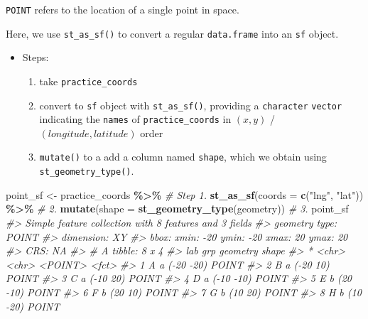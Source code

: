 \documentclass[
]{report}
\newenvironment{Shaded}{\begin{snugshade}}{\end{snugshade}}
\newcommand{\CommentTok}[1]{\textcolor[rgb]{0.56,0.35,0.01}{\textit{#1}}}
\newcommand{\DataTypeTok}[1]{\textcolor[rgb]{0.13,0.29,0.53}{#1}}
\newcommand{\KeywordTok}[1]{\textcolor[rgb]{0.13,0.29,0.53}{\textbf{#1}}}
\newcommand{\NormalTok}[1]{#1}
\newcommand{\OperatorTok}[1]{\textcolor[rgb]{0.81,0.36,0.00}{\textbf{#1}}}
\newcommand{\StringTok}[1]{\textcolor[rgb]{0.31,0.60,0.02}{#1}}
\providecommand{\tightlist}{%
  \setlength{\itemsep}{0pt}\setlength{\parskip}{0pt}}
\begin{document}
\texttt{POINT} refers to the location of a single point in space.

Here, we use \texttt{st\_as\_sf()} to convert a regular \texttt{data.frame} into an \texttt{sf} object.

\begin{itemize}
\tightlist
\item
  Steps:

  \begin{enumerate}
  \def\labelenumi{\arabic{enumi}.}
  \tightlist
  \item
    take \texttt{practice\_coords}
  \item
    convert to \texttt{sf} object with \texttt{st\_as\_sf()}, providing a \texttt{character} \texttt{vector} indicating the \texttt{names} of \texttt{practice\_coords} in \((x, y)\) / \((longitude, latitude)\) order
  \item
    \texttt{mutate()} to a add a column named \texttt{shape}, which we obtain using \texttt{st\_geometry\_type()}.
  \end{enumerate}
\end{itemize}

\begin{Shaded}
\begin{Highlighting}[]
\NormalTok{point\_sf \textless{}{-}}\StringTok{ }\NormalTok{practice\_coords }\OperatorTok{\%\textgreater{}\%}\StringTok{              }\CommentTok{\# Step 1.}
\StringTok{  }\KeywordTok{st\_as\_sf}\NormalTok{(}\DataTypeTok{coords =} \KeywordTok{c}\NormalTok{(}\StringTok{"lng"}\NormalTok{, }\StringTok{"lat"}\NormalTok{)) }\OperatorTok{\%\textgreater{}\%}\StringTok{     }\CommentTok{\# 2.}
\StringTok{  }\KeywordTok{mutate}\NormalTok{(}\DataTypeTok{shape =} \KeywordTok{st\_geometry\_type}\NormalTok{(geometry)) }\CommentTok{\# 3.}
\NormalTok{point\_sf}
\CommentTok{\#\textgreater{} Simple feature collection with 8 features and 3 fields}
\CommentTok{\#\textgreater{} geometry type:  POINT}
\CommentTok{\#\textgreater{} dimension:      XY}
\CommentTok{\#\textgreater{} bbox:           xmin: {-}20 ymin: {-}20 xmax: 20 ymax: 20}
\CommentTok{\#\textgreater{} CRS:            NA}
\CommentTok{\#\textgreater{} \# A tibble: 8 x 4}
\CommentTok{\#\textgreater{}   lab   grp    geometry shape}
\CommentTok{\#\textgreater{} * \textless{}chr\textgreater{} \textless{}chr\textgreater{}   \textless{}POINT\textgreater{} \textless{}fct\textgreater{}}
\CommentTok{\#\textgreater{} 1 A     a     ({-}20 {-}20) POINT}
\CommentTok{\#\textgreater{} 2 B     a      ({-}20 10) POINT}
\CommentTok{\#\textgreater{} 3 C     a      ({-}10 20) POINT}
\CommentTok{\#\textgreater{} 4 D     a     ({-}10 {-}10) POINT}
\CommentTok{\#\textgreater{} 5 E     b      (20 {-}10) POINT}
\CommentTok{\#\textgreater{} 6 F     b       (20 10) POINT}
\CommentTok{\#\textgreater{} 7 G     b       (10 20) POINT}
\CommentTok{\#\textgreater{} 8 H     b      (10 {-}20) POINT}
\end{Highlighting}
\end{Shaded}
\end{document}
